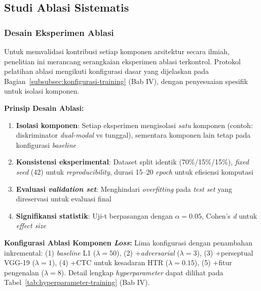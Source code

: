 \documentclass[12pt,a4paper]{article}
\begin{document}
\vspace{0.8em}

\subsection{Studi Ablasi Sistematis}
\label{subsec:studi-ablasi}
\vspace{0.8em}

\subsubsection{Desain Eksperimen Ablasi}
\label{subsubsec:desain-ablasi}

Untuk memvalidasi kontribusi setiap komponen arsitektur secara ilmiah, penelitian ini merancang serangkaian eksperimen ablasi terkontrol. Protokol pelatihan ablasi mengikuti konfigurasi dasar yang dijelaskan pada Bagian~\ref{subsubsec:konfigurasi-training} (Bab IV), dengan penyesuaian spesifik untuk isolasi komponen.

\textbf{Prinsip Desain Ablasi:}
\begin{enumerate}[nosep]
    \item \textbf{Isolasi komponen}: Setiap eksperimen mengisolasi \emph{satu} komponen (contoh: diskriminator \textit{dual-modal} vs tunggal), sementara komponen lain tetap pada konfigurasi \textit{baseline}
    \item \textbf{Konsistensi eksperimental}: Dataset split identik (70\%/15\%/15\%), \textit{fixed seed} (42) untuk \textit{reproducibility}, durasi 15--20 \textit{epoch} untuk efisiensi komputasi
    \item \textbf{Evaluasi \textit{validation set}}: Menghindari \textit{overfitting} pada \textit{test set} yang direservasi untuk evaluasi final
    \item \textbf{Signifikansi statistik}: Uji-t berpasangan dengan $\alpha = 0.05$, Cohen's \textit{d} untuk \textit{effect size}
\end{enumerate}

\textbf{Konfigurasi Ablasi Komponen \textit{Loss}:} Lima konfigurasi dengan penambahan inkremental: (1) \textit{baseline} L1 ($\lambda=50$), (2) +\textit{adversarial} ($\lambda=3$), (3) +perseptual VGG-19 ($\lambda=1$), (4) +CTC untuk kesadaran HTR ($\lambda=0.15$), (5) +fitur pengenalan ($\lambda=8$). Detail lengkap \textit{hyperparameter} dapat dilihat pada Tabel~\ref{tab:hyperparameter-training} (Bab IV).

\vspace{0.5em}
\end{document}
